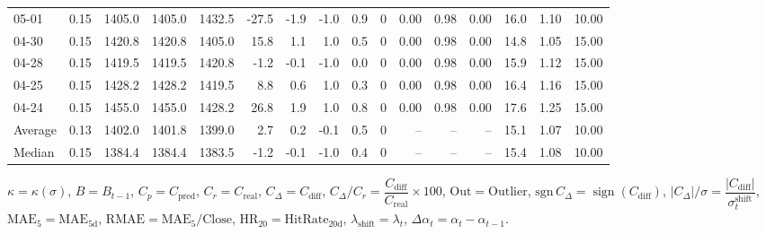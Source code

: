 \begin{threeparttable}
{\begin{tabular}{lrrrrrrrrrrrrrrr}
  05-01 &     0.15 & 1405.0 & 1405.0 & 1432.5 &      -27.5 &           -1.9 &                     -1.0 &                 0.9 &              0 &       0.00 &      0.98 &           0.00 &             16.0 &            1.10 &                  10.00 \\
  04-30 &     0.15 & 1420.8 & 1420.8 & 1405.0 &       15.8 &            1.1 &                      1.0 &                 0.5 &              0 &       0.00 &      0.98 &           0.00 &             14.8 &            1.05 &                  15.00 \\
  04-28 &     0.15 & 1419.5 & 1419.5 & 1420.8 &       -1.2 &           -0.1 &                     -1.0 &                 0.0 &              0 &       0.00 &      0.98 &           0.00 &             15.9 &            1.12 &                  15.00 \\
  04-25 &     0.15 & 1428.2 & 1428.2 & 1419.5 &        8.8 &            0.6 &                      1.0 &                 0.3 &              0 &       0.00 &      0.98 &           0.00 &             16.4 &            1.16 &                  15.00 \\
  04-24 &     0.15 & 1455.0 & 1455.0 & 1428.2 &       26.8 &            1.9 &                      1.0 &                 0.8 &              0 &       0.00 &      0.98 &           0.00 &             17.6 &            1.25 &                  15.00 \\
Average &     0.13 & 1402.0 & 1401.8 & 1399.0 &        2.7 &            0.2 &                     -0.1 &                 0.5 &              0 &         -- &        -- &             -- &             15.1 &            1.07 &                  10.00 \\
 Median &     0.15 & 1384.4 & 1384.4 & 1383.5 &       -1.2 &           -0.1 &                     -1.0 &                 0.4 &              0 &         -- &        -- &             -- &             15.4 &            1.08 &                  10.00 \\
\bottomrule
\end{tabular}
}
\begin{tablenotes}\footnotesize
\item $\kappa=\kappa(\sigma)$, $B=B_{t-1}$, $C_p=C_{\text{pred}}$, $C_r=C_{\text{real}}$, $C_\Delta=C_{\text{diff}}$, $C_\Delta/C_r=\dfrac{C_{\text{diff}}}{C_{\text{real}}}\times100$, $\mathrm{Out}=\text{Outlier}$, $\mathrm{sgn}\,C_\Delta=\operatorname{sign}(C_{\text{diff}})$, $|C_\Delta|/\sigma=\dfrac{|C_{\text{diff}}|}{\sigma_t^{\text{shift}}}$, $\mathrm{MAE}_5=\mathrm{MAE}_{5\text{d}}$, $\mathrm{RMAE}= \mathrm{MAE}_5 / \text{Close}$, $\mathrm{HR}_{20}=\mathrm{HitRate}_{20\text{d}}$, 
$\lambda_{\text{shift}}=\lambda_t$, 
$\Delta\alpha_t=\alpha_t-\alpha_{t-1}$.
\end{tablenotes}
\end{threeparttable}
\endgroup

